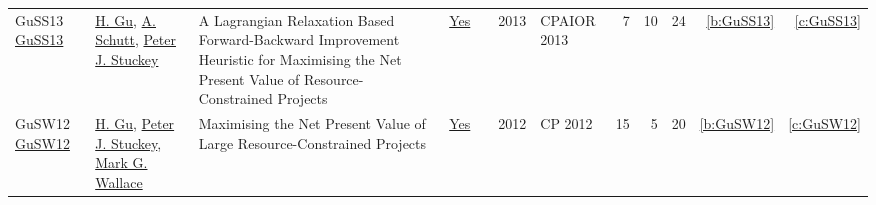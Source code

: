 {\begin{longtable}{>{\raggedright\arraybackslash}p{3cm}>{\raggedright\arraybackslash}p{6cm}>{\raggedright\arraybackslash}p{6.5cm}rrrp{2.5cm}rrrrr}
GuSS13 \href{https://doi.org/10.1007/978-3-642-38171-3\_24}{GuSS13} & \hyperref[auth:a342]{H. Gu}, \hyperref[auth:a125]{A. Schutt}, \hyperref[auth:a126]{Peter J. Stuckey} & A Lagrangian Relaxation Based Forward-Backward Improvement Heuristic for Maximising the Net Present Value of Resource-Constrained Projects & \href{../works/GuSS13.pdf}{Yes} & \cite{GuSS13} & 2013 & CPAIOR 2013 & 7 & 10 & 24 & \ref{b:GuSS13} & \ref{c:GuSS13}\\
GuSW12 \href{https://doi.org/10.1007/978-3-642-33558-7\_55}{GuSW12} & \hyperref[auth:a342]{H. Gu}, \hyperref[auth:a126]{Peter J. Stuckey}, \hyperref[auth:a156]{Mark G. Wallace} & Maximising the Net Present Value of Large Resource-Constrained Projects & \href{../works/GuSW12.pdf}{Yes} & \cite{GuSW12} & 2012 & CP 2012 & 15 & 5 & 20 & \ref{b:GuSW12} & \ref{c:GuSW12}\\
\end{longtable}
}

\clearpage
